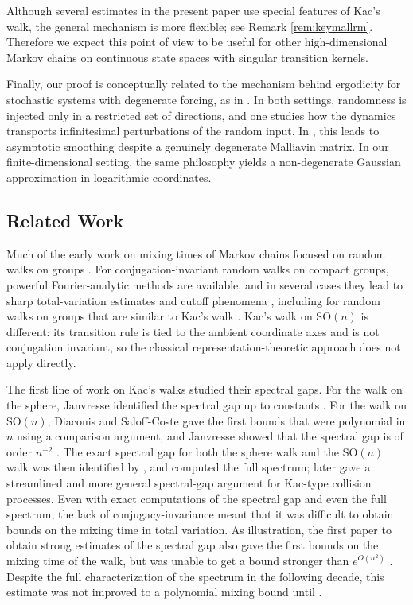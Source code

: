 \documentclass[11pt, reqno]{amsart}
\numberwithin{equation}{section}
\theoremstyle{remark}
\newcommand{\1}{\mathbf{1}}
\newcommand{\SO}{\mathrm{SO}}
\begin{document}
Although several estimates in the present paper use special features of Kac's
walk, the general mechanism is more flexible; see Remark \ref{rem:keymallrm}.
Therefore we expect this point of view
to be useful for other high-dimensional Markov chains on continuous state spaces
with singular transition kernels.

Finally, our proof is conceptually related to the mechanism behind ergodicity for
stochastic systems with degenerate forcing, as in \cite{HairerMattingly2006}.  In
both settings, randomness is injected only in a restricted set of directions, and
one studies how the dynamics transports infinitesimal perturbations of the random
input.  In \cite{HairerMattingly2006}, this leads to asymptotic smoothing despite
a genuinely degenerate Malliavin matrix.  In our finite-dimensional setting, the
same philosophy yields a non-degenerate Gaussian approximation in logarithmic
coordinates.
\subsection{Related Work}
Much of the early work on mixing times of Markov chains focused on random walks on groups \cite{DiaconisShahshahani1981,Aldous1983}. For conjugation-invariant random walks on compact groups, powerful Fourier-analytic methods are available, and in several cases they lead to sharp total-variation estimates and cutoff phenomena \cite{Diaconiscut}, including for random walks on groups that are similar to Kac's walk \cite{Rosenthal,Porod,HoughJiang}. Kac's walk on $\SO(n)$ is different: its transition rule is tied to the ambient coordinate axes and is not conjugation invariant, so the classical representation-theoretic approach does not apply directly. 

The first line of work on Kac's walks studied their spectral gaps. For the walk on the sphere, Janvresse identified the spectral gap up to constants \cite{Jan01}. For the walk on $\SO(n)$, Diaconis and Saloff-Coste gave the first bounds that were polynomial in $n$ using a comparison argument, and Janvresse showed that the spectral gap is of order $n^{-2}$ \cite{DSC00,Jan03}. The exact spectral gap for both the sphere walk and the $\SO(n)$ walk was then identified by \cite{CCL03}, and \cite{Mas03} computed the full spectrum; \cite{Cap08} later gave a streamlined and more general spectral-gap argument for Kac-type collision processes.  Even with exact computations of the spectral gap and even the full spectrum, the lack of conjugacy-invariance meant that it was difficult to obtain bounds on the mixing time in total variation. As illustration, the first paper to obtain strong estimates of the spectral gap also gave the first bounds on the mixing time of the walk, but was unable to get a bound stronger than $e^{O(n^{2})}$ \cite{DSC00}. Despite the full characterization of the spectrum in the following decade, this estimate was not improved to a polynomial mixing bound until \cite{JiangSO}.
\end{document}
